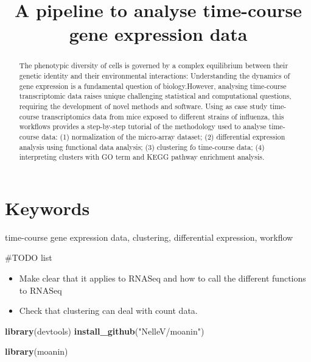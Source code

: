 \documentclass[9pt,a4paper,]{extarticle}
\newenvironment{Shaded}{\begin{snugshade}}{\end{snugshade}}
\newcommand{\KeywordTok}[1]{\textcolor[rgb]{0.13,0.29,0.53}{\textbf{#1}}}
\newcommand{\NormalTok}[1]{#1}
\newcommand{\StringTok}[1]{\textcolor[rgb]{0.31,0.60,0.02}{#1}}
\begin{document}
\pagestyle{front}

\title{A pipeline to analyse time-course gene expression data}


\maketitle
\thispagestyle{front}

\begin{abstract}
The phenotypic diversity of cells is governed by a complex equilibrium between their genetic identity and their environmental interactions: Understanding the dynamics of gene expression is a fundamental question of biology.However, analysing time-course transcriptomic data raises unique challenging statistical and computational questions, requiring the development of novel methods and software. Using as case study time-course transcriptomics data from mice exposed to different strains of influenza, this workflows provides a step-by-step tutorial of the methodology used to analyse time-course data: (1) normalization of the micro-array dataset; (2) differential expression analysis using functional data analysis; (3) clustering fo time-course data; (4) interpreting clusters with GO term and KEGG pathway enrichment analysis.
\end{abstract}

\section*{Keywords}
time-course gene expression data, clustering, differential expression, workflow


\clearpage
\pagestyle{main}

\#TODO list

\begin{itemize}
\tightlist
\item
  Make clear that it applies to RNASeq and how to call the different functions
  to RNASeq
\item
  Check that clustering can deal with count data.
\end{itemize}

\begin{Shaded}
\begin{Highlighting}[]
\KeywordTok{library}\NormalTok{(devtools)}
\KeywordTok{install_github}\NormalTok{(}\StringTok{"NelleV/moanin"}\NormalTok{)}

\KeywordTok{library}\NormalTok{(moanin)}
\end{Highlighting}
\end{Shaded}
\end{document}
